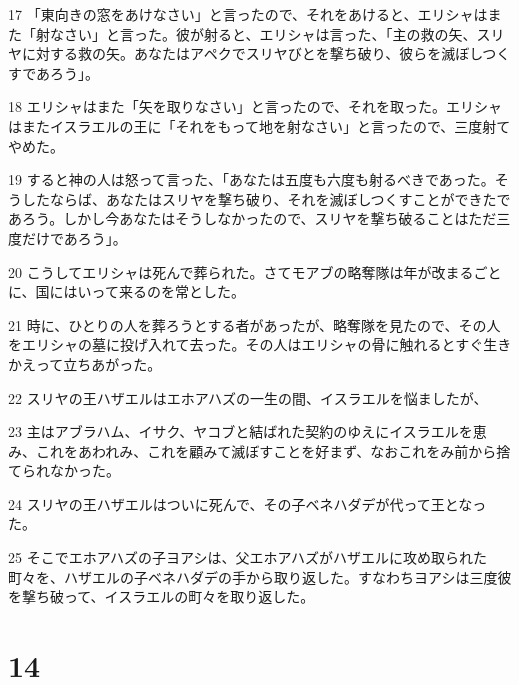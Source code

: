 \par 17 「東向きの窓をあけなさい」と言ったので、それをあけると、エリシャはまた「射なさい」と言った。彼が射ると、エリシャは言った、「主の救の矢、スリヤに対する救の矢。あなたはアペクでスリヤびとを撃ち破り、彼らを滅ぼしつくすであろう」。
\par 18 エリシャはまた「矢を取りなさい」と言ったので、それを取った。エリシャはまたイスラエルの王に「それをもって地を射なさい」と言ったので、三度射てやめた。
\par 19 すると神の人は怒って言った、「あなたは五度も六度も射るべきであった。そうしたならば、あなたはスリヤを撃ち破り、それを滅ぼしつくすことができたであろう。しかし今あなたはそうしなかったので、スリヤを撃ち破ることはただ三度だけであろう」。
\par 20 こうしてエリシャは死んで葬られた。さてモアブの略奪隊は年が改まるごとに、国にはいって来るのを常とした。
\par 21 時に、ひとりの人を葬ろうとする者があったが、略奪隊を見たので、その人をエリシャの墓に投げ入れて去った。その人はエリシャの骨に触れるとすぐ生きかえって立ちあがった。
\par 22 スリヤの王ハザエルはエホアハズの一生の間、イスラエルを悩ましたが、
\par 23 主はアブラハム、イサク、ヤコブと結ばれた契約のゆえにイスラエルを恵み、これをあわれみ、これを顧みて滅ぼすことを好まず、なおこれをみ前から捨てられなかった。
\par 24 スリヤの王ハザエルはついに死んで、その子ベネハダデが代って王となった。
\par 25 そこでエホアハズの子ヨアシは、父エホアハズがハザエルに攻め取られた町々を、ハザエルの子ベネハダデの手から取り返した。すなわちヨアシは三度彼を撃ち破って、イスラエルの町々を取り返した。

\chapter{14}

